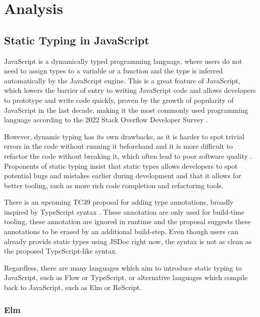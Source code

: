 \chapter{Analysis}

\section{Static Typing in JavaScript}

JavaScript is a dynamically typed programming language, where users do not need to assign types to a variable or a function and the type is inferred automatically by the JavaScript engine. This is a great feature of JavaScript, which lowers the barrier of entry to writing JavaScript code and allows developers to prototype and write code quickly, proven by the growth of popularity of JavaScript in the last decade, making it the most commonly used programming language according to the 2022 Stack Overflow Developer Survey \cite{StackOverflowDeveloper}.

However, dynamic typing has its own drawbacks, as it is harder to spot trivial errors in the code without running it beforehand and it is more difficult to refactor the code without breaking it, which often lead to poor software quality \cite{fardJSNOSEDetectingJavaScript2013a}. Proponents of static typing insist that static types allows developers to spot potential bugs and mistakes earlier during development and that it allows for better tooling, such as more rich code completion and refactoring tools.

There is an upcoming TC39 proposal for adding type annotations, broadly inspired by TypeScript syntax \cite{ECMAScriptProposalType2023}. These annotation are only used for build-time tooling, these annotation are ignored in runtime and the proposal suggests these annotations to be erased by an additional build-step. Even though users can already provide static types using JSDoc right now, the syntax is not as clean as the proposed TypeScript-like syntax.

Regardless, there are many languages which aim to introduce static typing to JavaScript, such as Flow or TypeScript, or alternative languages which compile back to JavaScript, such as Elm or ReScript.

\subsection{Elm}

